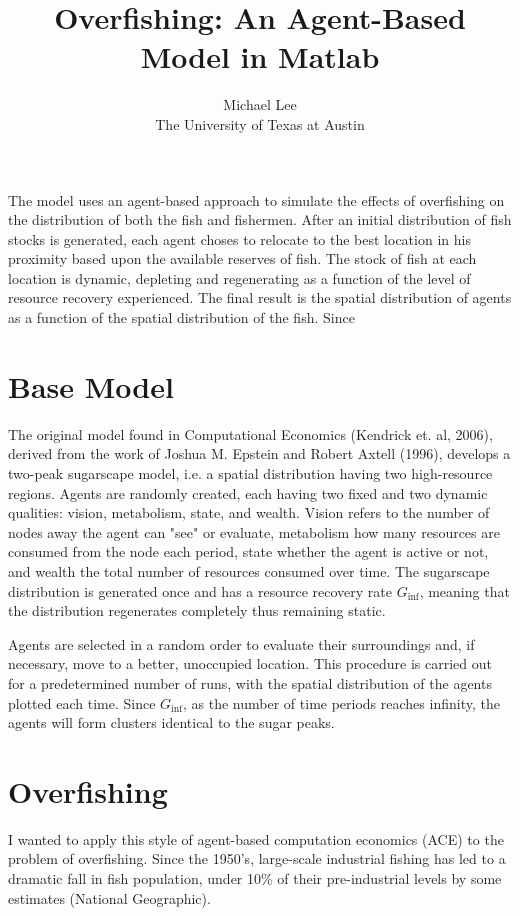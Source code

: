 \documentclass{article}
\title{Overfishing: An Agent-Based Model in Matlab}
\author{Michael Lee \\ The University of Texas at Austin}
\begin{document}
\maketitle{}

The model uses an agent-based approach to simulate the effects of overfishing on the distribution of both the fish and fishermen. After an initial distribution of fish stocks is generated, each agent choses to relocate to the best location in his proximity based upon the available reserves of fish. The stock of fish at each location is dynamic, depleting and regenerating as a function of the level of resource recovery experienced. The final result is the spatial distribution of agents as a function of the spatial distribution of the fish. Since 

\newpage

\section{Base Model}
The original model found in Computational Economics (Kendrick et. al, 2006), derived from the work of Joshua M. Epstein and Robert Axtell (1996), develops a two-peak sugarscape model, i.e. a spatial distribution having two high-resource regions. Agents are randomly created, each having two fixed and two dynamic qualities: vision, metabolism, state, and wealth. Vision refers to the number of nodes away the agent can "see" or evaluate, metabolism how many resources are consumed from the node each period, state whether the agent is active or not, and wealth the total number of resources consumed over time. The sugarscape distribution is generated once and has a resource recovery rate \emph{$G_{\inf}$}, meaning that the distribution regenerates completely thus remaining static. \*

Agents are selected in a random order to evaluate their surroundings and, if necessary, move to a better, unoccupied location. This procedure is carried out for a predetermined number of runs, with the spatial distribution of the agents plotted each time. Since \emph{$G_{\inf}$}, as the number of time periods reaches infinity, the agents will form clusters identical to the sugar peaks.   \*

\section{Overfishing}
I wanted to apply this style of agent-based computation economics (ACE) to the problem of overfishing. Since the 1950's, large-scale industrial fishing has led to a dramatic fall in fish population, under 10\% of their pre-industrial levels by some estimates (National Geographic).
\end{document}
